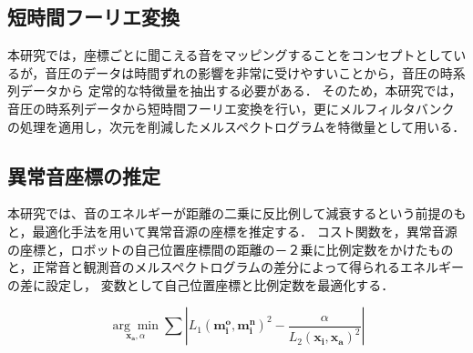 \documentclass[../main]{subfiles}
\begin{document}
\subsection{短時間フーリエ変換}
本研究では，座標ごとに聞こえる音をマッピングすることをコンセプトとしているが，音圧のデータは時間ずれの影響を非常に受けやすいことから，音圧の時系列データから
定常的な特徴量を抽出する必要がある．
そのため，本研究では，音圧の時系列データから短時間フーリエ変換を行い，更にメルフィルタバンクの処理を適用し，次元を削減したメルスペクトログラムを特徴量として用いる．
\subsection{異常音座標の推定}
本研究では、音のエネルギーが距離の二乗に反比例して減衰するという前提のもと，最適化手法を用いて異常音源の座標を推定する．
コスト関数を，異常音源の座標と，ロボットの自己位置座標間の距離の－２乗に比例定数をかけたものと，正常音と観測音のメルスペクトログラムの差分によって得られるエネルギーの差に設定し，
変数として自己位置座標と比例定数を最適化する．

\begin{equation}
  \underset{\mathbf{x_a}, \alpha}{\arg\min} \sum \left| L_1 (\mathbf{m_i^o}, \mathbf{m_i^n})^2 - \frac{\alpha}{L_2 (\mathbf{x_i}, \mathbf{x_a})^2} \right|
\end{equation}
\end{document}
